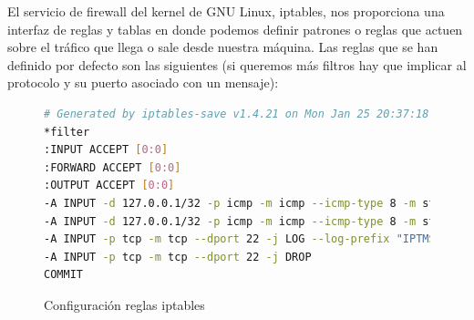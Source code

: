 El servicio de firewall del kernel de GNU Linux, iptables, nos proporciona una interfaz de reglas y tablas en donde podemos definir patrones o reglas que actuen sobre el tráfico que llega o sale desde nuestra máquina. Las reglas que se han definido por defecto son las siguientes (si queremos más filtros hay que implicar al protocolo y su puerto asociado con un mensaje):

\begin{figure}[H]
\begin{lstlisting}[language=bash]
# Generated by iptables-save v1.4.21 on Mon Jan 25 20:37:18 2016
*filter
:INPUT ACCEPT [0:0]
:FORWARD ACCEPT [0:0]
:OUTPUT ACCEPT [0:0]
-A INPUT -d 127.0.0.1/32 -p icmp -m icmp --icmp-type 8 -m state --state NEW,RELATED,ESTABLISHED -j LOG --log-prefix "IPTMSG=Connection ICMP "
-A INPUT -d 127.0.0.1/32 -p icmp -m icmp --icmp-type 8 -m state --state NEW,RELATED,ESTABLISHED -j DROP
-A INPUT -p tcp -m tcp --dport 22 -j LOG --log-prefix "IPTMSG=Connection SSH "
-A INPUT -p tcp -m tcp --dport 22 -j DROP
COMMIT
\end{lstlisting}
\caption{Configuración reglas iptables}
\end{figure}

